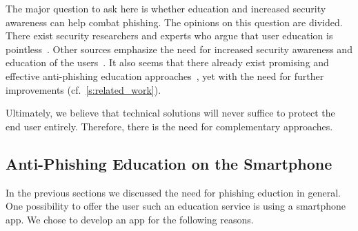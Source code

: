 The major question to ask here is whether education and increased security awareness can help combat phishing.
The opinions on this question are divided.
There exist security researchers and experts who argue that user education is pointless~\cite{useredupointless, bruceschneieronsecuritytraining}.
Other sources emphasize the need for increased security awareness and education of the users~\cite{usereducebit, usereduscmagazine}.
It also seems that there already exist promising and effective anti-phishing education approaches~\cite{kumaraguru2007protecting, sheng2007antiphishingphil}, yet with the need for further improvements (cf.~\autoref{s:related_work}).

Ultimately, we believe that technical solutions will never suffice to protect the end user entirely.
Therefore, there is the need for complementary approaches.

\subsection{Anti-Phishing Education on the Smartphone}
\label{s:antiphishing_on_smartphone}
In the previous sections we discussed the need for phishing eduction in general. One possibility to offer the user such an education service is using a smartphone app.
We chose to develop an app for the following reasons.

